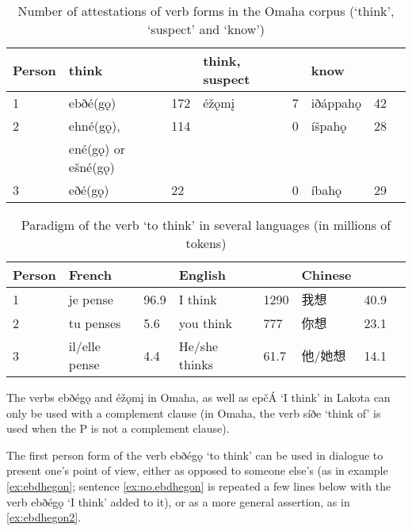 \documentclass[oldfontcommands,oneside,a4paper,11pt]{article}
\newcommand{\ipa}[1]{{\phon#1}} %
\newcommand{\zh}[1]{{\cn #1}}
\begin{document}
 

 \begin{table}[h]
\caption{Number of attestations of verb forms in the Omaha corpus (`think', `suspect' and `know')}  \label{tab:cognition} \centering
\begin{tabular}{l|ll|ll|lll}
\toprule
Person	&think &	&	think, suspect &	&	know &	&	\\
 \midrule
1 & 	\ipa{ebðé(gǫ)}  & 	172 & 	\ipa{éžǫmį} & 	7 & 	\ipa{iðáppahǫ} & 	42 & 	\\
2 & 	\ipa{ehné(gǫ)},  & 	114 & 	 & 	0 & 	\ipa{íšpahǫ} & 	28 & 	\\
& \ipa{ené(gǫ)} or \ipa{ešné(gǫ)} &&&&\\
3 & 	\ipa{eðé(gǫ)} & 	22 & 	 & 	0 & 	\ipa{íbahǫ} & 	29 & 	\\
	\bottomrule			
\end{tabular}
\end{table} 


 \begin{table}[h]
\caption{Paradigm of the verb `to think' in several languages (in millions of tokens)}  \label{tab:cognition2} \centering
\begin{tabular}{l|ll|ll|lll}
\toprule
Person	&French & & English && Chinese && \\
 \midrule
1 & \ipa{je pense} & 96.9 & \ipa{I think}  & 1290 & \zh{我想} &40.9 \\
2 & \ipa{tu penses} & 5.6 & \ipa{you think}  &777& \zh{你想} &23.1 \\
3 &  \ipa{il/elle pense} & 4.4 & \ipa{He/she thinks}  &61.7& \zh{他/她想} &14.1 \\
	\bottomrule			
\end{tabular}
\end{table} 



The verbs \ipa{ebðégǫ} and  	\ipa{éžǫmį} in Omaha, as well as   \ipa{epčÁ} `I think' in Lakota can only be used with a complement clause (in Omaha, the verb \ipa{síðe} `think of' is used when the P is not a complement clause).

The first person form of the verb   \ipa{ebðégǫ}  `to think'  can be used  in dialogue to present one's point of view, either as  opposed to someone else's (as in  example   \ref{ex:ebdhegon}; sentence \ref{ex:no.ebdhegon} is repeated a few lines below  with the verb \ipa{ebðégǫ} `I think' added to it), or as a more general assertion, as in \ref{ex:ebdhegon2}.
\end{document}
